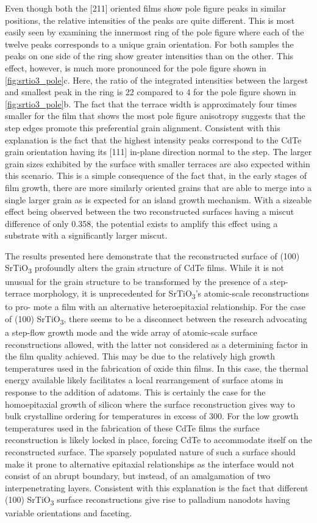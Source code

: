 Even though both the [211] oriented films show pole figure peaks in similar positions, the relative intensities of the peaks are quite different.
This is most easily seen by examining the innermost ring of the pole figure where each of the twelve peaks corresponds to a unique grain orientation.
For both samples the peaks on one side of the ring show greater intensities than on the other.
This effect, however, is much more pronounced for the pole figure shown in \cref{fig:srtio3_pole}c.
Here, the ratio of the integrated intensities between the largest and smallest peak in the ring is 22 compared to 4 for the pole figure shown in \cref{fig:srtio3_pole}b.
The fact that the terrace width is approximately four times smaller for the film that shows the most pole figure anisotropy suggests that the step edges promote this preferential grain alignment.
Consistent with this explanation is the fact that the highest intensity peaks correspond to the CdTe grain orientation having its [111] in-plane direction normal to the step.
The larger grain sizes exhibited by the surface with smaller terraces are also expected within this scenario.
This is a simple consequence of the fact that, in the early stages of film growth, there are more similarly oriented grains that are able to merge into a single larger grain as is expected for an island growth mechanism.
With a sizeable effect being observed between the two reconstructed surfaces having a miscut difference of only 0.358, the potential exists to amplify this effect using a substrate with a significantly larger miscut.

The results presented here demonstrate that the reconstructed surface of (100) SrTiO\textsubscript{3} profoundly alters the grain structure of CdTe films.
While it is not unusual for the grain structure to be transformed by the presence of a step-terrace morphology, it is unprecedented for SrTiO\textsubscript{3}’s atomic-scale reconstructions to pro- mote a film with an alternative heteroepitaxial relationship.
For the case of (100) SrTiO\textsubscript{3}, there seems to be a disconnect between the research advocating a step-flow growth mode and the wide array of atomic-scale surface reconstructions allowed, with the latter not considered as a determining factor in the film quality achieved.
This may be due to the relatively high growth temperatures used in the fabrication of oxide thin films.
In this case, the thermal energy available likely facilitates a local rearrangement of surface atoms in response to the addition of adatoms.
This is certainly the case for the homoepitaxial growth of silicon where the surface reconstruction gives way to bulk crystalline ordering for temperatures in excess of 300\celsius{}\cite{Gossmann1985}.
For the low growth temperatures used in the fabrication of these CdTe films the surface reconstruction is likely locked in place, forcing CdTe to accommodate itself on the reconstructed surface.
The sparsely populated nature of such a surface should make it prone to alternative epitaxial relationships as the interface would not consist of an abrupt boundary, but instead, of an amalgamation of two interpenetrating layers.
Consistent with this explanation is the fact that different (100) SrTiO\textsubscript{3} surface reconstructions give rise to palladium nanodots having variable orientations and faceting\cite{Silly2005b}.
